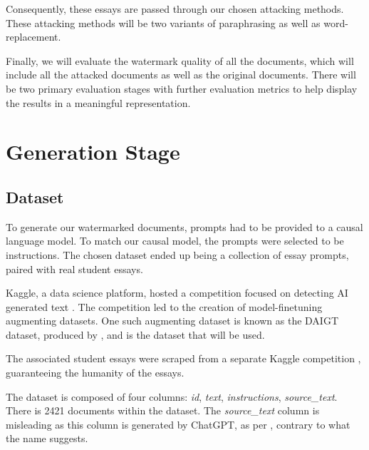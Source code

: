\documentclass{l4proj}
\theoremstyle{definition}
\begin{document}
    Consequently, these essays are passed through our chosen attacking methods. These attacking methods will be two variants of paraphrasing as well as word-replacement. 

    Finally, we will evaluate the watermark quality of all the documents, which will include all the attacked documents as well as the original documents. There will be two primary evaluation stages with further evaluation metrics to help display the results in a meaningful representation.

\section{Generation Stage}
    \subsection{Dataset}    
        To generate our watermarked documents, prompts had to be provided to a causal language model. To match our causal model, the prompts were selected to be instructions. The chosen dataset ended up being a collection of essay prompts, paired with real student essays. 
    
        Kaggle, a data science platform, hosted a competition focused on detecting AI generated text \citep{llm-detect-ai-generated-text}. The competition led to the creation of model-finetuning augmenting datasets. One such augmenting dataset is known as the DAIGT dataset, produced by \citet{Paullier2023-rx}, and is the dataset that will be used.

        The associated student essays were scraped from a separate Kaggle competition \citep{feedback-prize-english-language-learning}, guaranteeing the humanity of the essays.

        The dataset is composed of four columns: \emph{id}, \emph{text}, \emph{instructions}, \emph{source\_text}. There is 2421 documents within the dataset. The \emph{source\_text} column is misleading as this column is generated by ChatGPT, as per \citet{Paullier2023-rx}, contrary to what the name suggests. 
\end{document}

